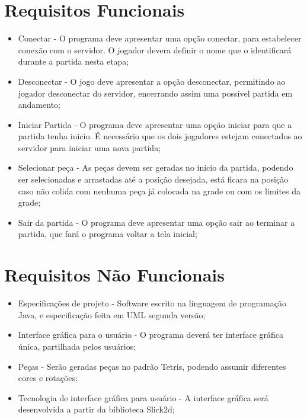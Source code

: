\documentclass[
	12pt,	
	openany,			
	oneside,			
	a4paper,			
	english,			
	french,			
	spanish,			
	brazil,	
	]{abntex2}
\begin{document}
\section{Requisitos Funcionais}
\begin{itemize}
\item Conectar - O programa deve apresentar uma opção conectar, para estabelecer conexão com o servidor. O jogador devera definir o nome que o identificará durante a partida nesta etapa;
\item Desconectar - O jogo deve apresentar a opção desconectar, permitindo ao jogador desconectar do servidor, encerrando assim uma possível partida em andamento;
\item Iniciar Partida - O programa deve apresentar uma opção iniciar para que a partida tenha inicio. É necessário que os dois jogadores estejam conectados ao servidor para iniciar uma nova partida;
\item Selecionar peça - As peças devem ser geradas no inicio da partida, podendo ser selecionadas e arrastadas até a posição desejada, está ficara na posição caso não colida com nenhuma peça já colocada na grade ou com os limites da grade;
\item Sair da partida - O programa deve apresentar uma opção sair ao terminar a partida, que fará o programa voltar a tela inicial;
\end{itemize}

\section{Requisitos Não Funcionais}
\begin{itemize}
\item Especificações de projeto - Software escrito na linguagem de programação Java, e especificação feita em UML segunda versão;
\item Interface gráfica para o usuário - O programa deverá ter interface gráfica única, partilhada pelos usuários;
\item Peças - Serão geradas peças no padrão Tetris, podendo assumir diferentes cores e rotações;
\item Tecnologia de interface gráfica para usuário - A interface gráfica será desenvolvida a partir da biblioteca Slick2d;
\end{itemize}
\end{document}
